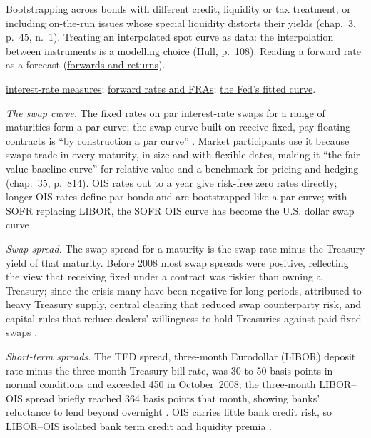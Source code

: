 \begin{qfmethod}
 Bootstrapping across bonds with different credit, liquidity or tax treatment, or including on-the-run issues whose special liquidity distorts their yields (chap.~3, p.~45, n.~1). Treating an interpolated spot curve as data: the interpolation between instruments is a modelling choice (Hull, p.~108). Reading a forward rate as a forecast (\hyperref[meth:forward-rates-expected-returns]{forwards and returns}).

 \hyperref[def:interest-rate-measures]{interest-rate measures}; \hyperref[mod:forward-rates-fra]{forward rates and FRAs}; \hyperref[data:gsw-treasury-curve]{the Fed's fitted curve}.

\end{qfmethod}

\begin{qfdefinition}\label{def:swap-curve-short-term-spreads}
 \emph{The swap curve.} The fixed rates on par interest-rate swaps for a range of maturities form a par curve; the swap curve built on receive-fixed, pay-floating contracts is ``by construction a par curve'' \citep[chap.~31, p.~692]{s7-fabozzifixed}. Market participants use it because swaps trade in every maturity, in size and with flexible dates, making it ``the fair value baseline curve'' for relative value and a benchmark for pricing and hedging (chap.~35, p.~814). OIS rates out to a year give risk-free zero rates directly; longer OIS rates define par bonds and are bootstrapped like a par curve; with SOFR replacing LIBOR, the SOFR OIS curve has become the U.S. dollar swap curve \citep[sec.~7.2, pp.~175--176]{s7-hulloptions}.

\emph{Swap spread.} The swap spread for a maturity is the swap rate minus the Treasury yield of that maturity. Before 2008 most swap spreads were positive, reflecting the view that receiving fixed under a contract was riskier than owning a Treasury; since the crisis many have been negative for long periods, attributed to heavy Treasury supply, central clearing that reduced swap counterparty risk, and capital rules that reduce dealers' willingness to hold Treasuries against paid-fixed swaps \citep[chap.~64, pp.~1580--1581]{s7-fabozzifixed}.

\emph{Short-term spreads.} The TED spread, three-month Eurodollar (LIBOR) deposit rate minus the three-month Treasury bill rate, was 30 to 50 basis points in normal conditions and exceeded 450 in October~2008; the three-month LIBOR--OIS spread briefly reached 364 basis points that month, showing banks' reluctance to lend beyond overnight \citep[sec.~8.2, p.~209]{s7-hulloptions}. OIS carries little bank credit risk, so LIBOR--OIS isolated bank term credit and liquidity premia \citep[chap.~13, p.~305]{s7-fabozzifixed}.


\end{qfdefinition}
